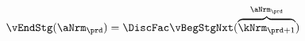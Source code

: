   \begin{equation}\begin{gathered}\begin{aligned}
        \vEndStg(\aNrm_{\prd}) & = \DiscFac \vBegStgNxt(\overbrace{\kNrm_{\prd+1}}^{\aNrm_{\prd}}) \label{eq:vEndPrddefn}
      \end{aligned}\end{gathered}\end{equation}
